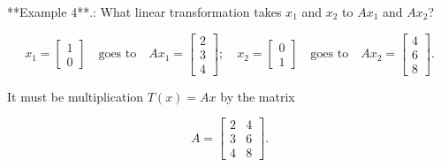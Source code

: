 **Example 4**.: What linear transformation takes \(x_{1}\) and \(x_{2}\) to \(Ax_{1}\) and \(Ax_{2}\)?

\[x_{1}=\begin{bmatrix}1\\ 0\end{bmatrix}\quad\text{goes to}\quad Ax_{1}=\begin{bmatrix}2\\ 3\\ 4\end{bmatrix};\quad x_{2}=\begin{bmatrix}0\\ 1\end{bmatrix}\quad\text{goes to}\quad Ax_{2}=\begin{bmatrix}4\\ 6\\ 8\end{bmatrix}.\]

It must be multiplication \(T(x)=Ax\) by the matrix

\[A=\begin{bmatrix}2&4\\ 3&6\\ 4&8\end{bmatrix}.\]